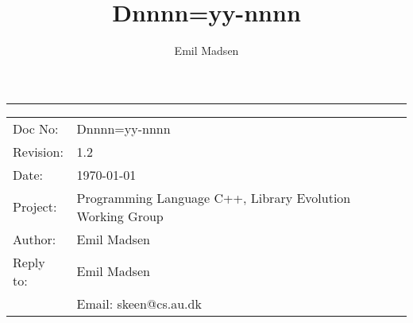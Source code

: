 \documentclass[english, 12pt, a4paper]{article}
\begin{document}
\title{Dnnnn=yy-nnnn\vspace{-1ex}}
\author{Emil Madsen}
\date{\vspace{-5ex}}

\maketitle
\hrule

\begin{center}
\begin{tabular}{ll}
  Doc No:   & Dnnnn=yy-nnnn   \\
  Revision: & 1.2             \\
  Date:     & \today          \\
  Project:  & Programming Language C++, Library Evolution Working Group \\
  Author:   & Emil Madsen     \\
  Reply to: & Emil Madsen     \\
            & Email: skeen@cs.au.dk
\end{tabular}
\end{center}

 

\end{document}
